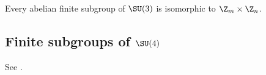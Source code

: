 \documentclass{worksheetclass}
\begin{document}
        \begin{theorem*}
            Every abelian finite subgroup of $\SU(3)$ is isomorphic to $\Z_m\times\Z_n$.
        \end{theorem*}

    \subsection{Finite subgroups of $\SU(4)$}

        See \cite{Hanany:1999sp}.

\printbibliography
\end{document}

